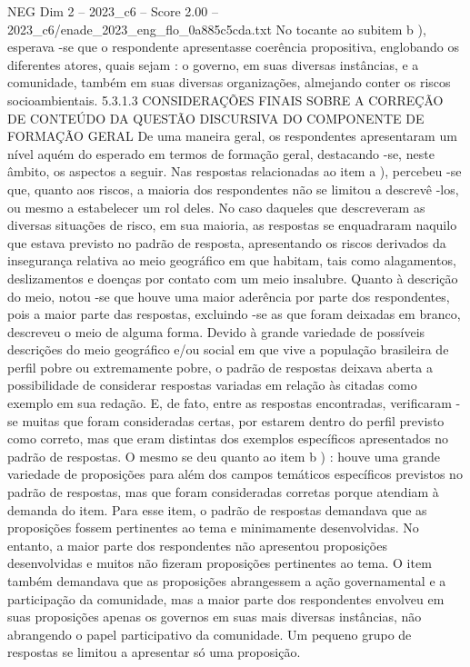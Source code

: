 \begin{textsample}{NEG Dim 2 – 2023\_c6 – Score 2.00 – 2023\_c6/enade\_2023\_eng\_flo\_0a885c5cda.txt}
No tocante ao subitem b ), esperava -se que o respondente apresentasse coerência propositiva, englobando os diferentes atores, quais sejam : o governo, em suas diversas instâncias, e a comunidade, também em suas diversas organizações, almejando conter os riscos socioambientais. 5.3.1.3 CONSIDERAÇÕES FINAIS SOBRE A CORREÇÃO DE CONTEÚDO DA QUESTÃO DISCURSIVA DO COMPONENTE DE FORMAÇÃO GERAL De uma maneira geral, os respondentes apresentaram um nível aquém do esperado em termos de formação geral, destacando -se, neste âmbito, os aspectos a seguir.
Nas respostas relacionadas ao item a ), percebeu -se que, quanto aos riscos, a maioria dos respondentes não se limitou a descrevê -los, ou mesmo a estabelecer um rol deles.
No caso daqueles que descreveram as diversas situações de risco, em sua maioria, as respostas se enquadraram naquilo que estava previsto no padrão de resposta, apresentando os riscos derivados da insegurança relativa ao meio geográfico em que habitam, tais como alagamentos, deslizamentos e doenças por contato com um meio insalubre.
Quanto à descrição do meio, notou -se que houve uma maior aderência por parte dos respondentes, pois a maior parte das respostas, excluindo -se as que foram deixadas em branco, descreveu o meio de alguma forma.
Devido à grande variedade de possíveis descrições do meio geográfico e/ou social em que vive a população brasileira de perfil pobre ou extremamente pobre, o padrão de respostas deixava aberta a possibilidade de considerar respostas variadas em relação às citadas como exemplo em sua redação.
E, de fato, entre as respostas encontradas, verificaram -se muitas que foram consideradas certas, por estarem dentro do perfil previsto como correto, mas que eram distintas dos exemplos específicos apresentados no padrão de respostas.
O mesmo se deu quanto ao item b ) : houve uma grande variedade de proposições para além dos campos temáticos específicos previstos no padrão de respostas, mas que foram consideradas corretas porque atendiam à demanda do item.
Para esse item, o padrão de respostas demandava que as proposições fossem pertinentes ao tema e minimamente desenvolvidas.
No entanto, a maior parte dos respondentes não apresentou proposições desenvolvidas e muitos não fizeram proposições pertinentes ao tema.
O item também demandava que as proposições abrangessem a ação governamental e a participação da comunidade, mas a maior parte dos respondentes envolveu em suas proposições apenas os governos em suas mais diversas instâncias, não abrangendo o papel participativo da comunidade.
Um pequeno grupo de respostas se limitou a apresentar só uma proposição.

\end{textsample}
